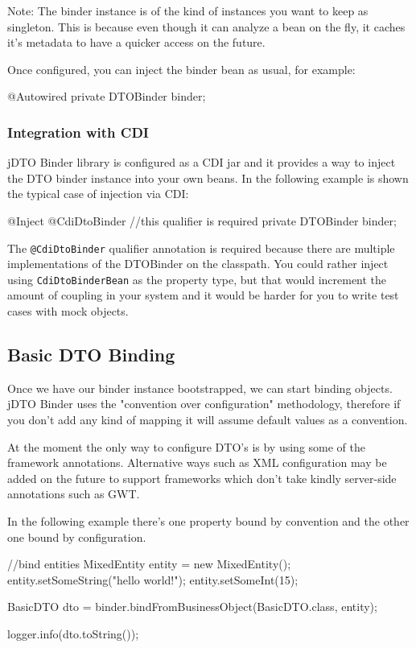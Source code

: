 \documentclass[11pt]{article}
\newcommand{\JDTO}{jDTO Binder\xspace}
\begin{document}
Note: The binder instance is of the kind of instances you want to keep as singleton. This is because even though it can analyze a bean on the fly, it caches it's metadata to have a quicker access on the future.

Once configured, you can inject the binder bean as usual, for example:


\begin{java}
@Autowired
private DTOBinder binder;
\end{java}

\subsubsection{Integration with CDI}

\JDTO library is configured as a CDI jar and it provides a way to inject the DTO binder instance into your own beans. In the following example is shown the typical case of injection via CDI:


\begin{java}
@Inject
@CdiDtoBinder //this qualifier is required
private DTOBinder binder;
\end{java}

The \texttt{@CdiDtoBinder} qualifier annotation is required because there are multiple implementations of the DTOBinder on the classpath. You could rather inject using \texttt{CdiDtoBinderBean} as the property type, but that would increment the amount of coupling in your system and it would be harder for you to write test cases with mock objects.

\subsection{Basic DTO Binding}


Once we have our binder instance bootstrapped, we can start binding objects. \JDTO uses the "convention over configuration"
methodology, therefore if you don't add any kind of mapping it will assume default values as a convention. 

At the moment the only way to configure DTO's is by using some of the framework annotations. Alternative ways such as XML configuration may be added on the future to support frameworks which don't take kindly server-side annotations such as GWT.

In the following example there's one property bound by convention and the other one bound by configuration.


\begin{java}
//bind entities
MixedEntity entity = new MixedEntity();
entity.setSomeString("hello world!");
entity.setSomeInt(15);
        
BasicDTO dto = binder.bindFromBusinessObject(BasicDTO.class, entity);
        
logger.info(dto.toString());
\end{java}
\end{document}
